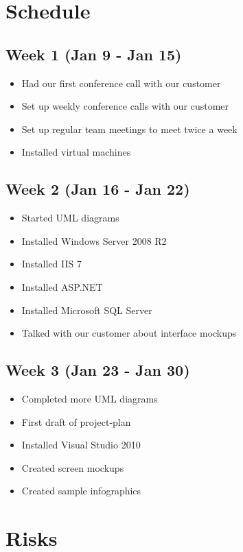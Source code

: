\documentclass[11pt,a4paper,oneside]{article}
\begin{document}
\section{Schedule}

\subsection{Week 1 (Jan 9 - Jan 15)}
\begin{itemize}
\item Had our first conference call with our customer
\item Set up weekly conference calls with our customer
\item Set up regular team meetings to meet twice a week
\item Installed virtual machines
\end{itemize}


\subsection{Week 2 (Jan 16 - Jan 22)}
\begin{itemize}
\item Started UML diagrams
\item Installed Windows Server 2008 R2
\item Installed IIS 7
\item Installed ASP.NET
\item Installed Microsoft SQL Server
\item Talked with our customer about interface mockups
\end{itemize}

\subsection{Week 3 (Jan 23 - Jan 30)}
\begin{itemize}
\item Completed more UML diagrams
\item First draft of project-plan
\item Installed Visual Studio 2010
\item Created screen mockups
\item Created sample infographics
\end{itemize}


\section{Risks}
\end{document}
